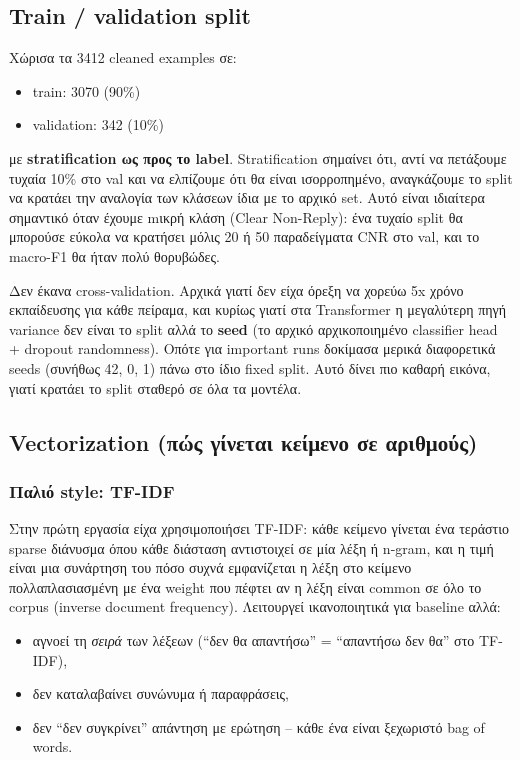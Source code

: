 \documentclass[12pt]{fphw}
\begin{document}
\subsection{Train / validation split}

Χώρισα τα 3412 cleaned examples σε:
\begin{itemize}
    \item train: 3070 (90\%)
    \item validation: 342 (10\%)
\end{itemize}
με \textbf{stratification ως προς το label}. Stratification σημαίνει ότι, αντί να πετάξουμε τυχαία 10\% στο val και να ελπίζουμε ότι θα είναι ισορροπημένο, αναγκάζουμε το split να κρατάει την αναλογία των κλάσεων ίδια με το αρχικό set. Αυτό είναι ιδιαίτερα σημαντικό όταν έχουμε mικρή κλάση (Clear Non-Reply): ένα τυχαίο split θα μπορούσε εύκολα να κρατήσει μόλις 20 ή 50 παραδείγματα CNR στο val, και το macro-F1 θα ήταν πολύ θορυβώδες.

Δεν έκανα cross-validation. Αρχικά γιατί δεν είχα όρεξη να χορεύω 5x χρόνο εκπαίδευσης για κάθε πείραμα, και κυρίως γιατί στα Transformer η μεγαλύτερη πηγή variance δεν είναι το split αλλά το \textbf{seed} (το αρχικό αρχικοποιημένο classifier head + dropout randomness). Οπότε για important runs δοκίμασα μερικά διαφορετικά seeds (συνήθως 42, 0, 1) πάνω στο ίδιο fixed split. Αυτό δίνει πιο καθαρή εικόνα, γιατί κρατάει το split σταθερό σε όλα τα μοντέλα.

\subsection{Vectorization (πώς γίνεται κείμενο σε αριθμούς)}

\subsubsection{Παλιό style: TF-IDF}

Στην πρώτη εργασία είχα χρησιμοποιήσει TF-IDF: κάθε κείμενο γίνεται ένα τεράστιο sparse διάνυσμα όπου κάθε διάσταση αντιστοιχεί σε μία λέξη ή n-gram, και η τιμή είναι μια συνάρτηση του πόσο συχνά εμφανίζεται η λέξη στο κείμενο πολλαπλασιασμένη με ένα weight που πέφτει αν η λέξη είναι common σε όλο το corpus (inverse document frequency). Λειτουργεί ικανοποιητικά για baseline αλλά:
\begin{itemize}
    \item αγνοεί τη \emph{σειρά} των λέξεων (``δεν θα απαντήσω'' = ``απαντήσω δεν θα'' στο TF-IDF),
    \item δεν καταλαβαίνει συνώνυμα ή παραφράσεις,
    \item δεν ``δεν συγκρίνει'' απάντηση με ερώτηση -- κάθε ένα είναι ξεχωριστό bag of words.
\end{itemize}
\end{document}
